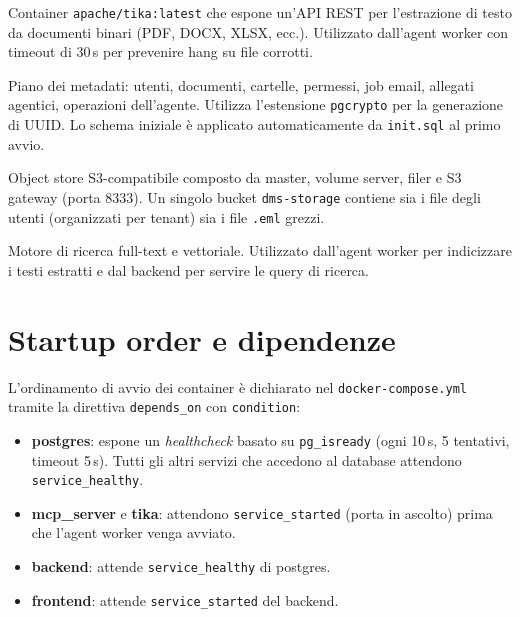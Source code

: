 \begin{description}[leftmargin=*]
    \item[Apache Tika (\texttt{tika})] Container \texttt{apache/tika:latest} che espone
          un'API REST per l'estrazione di testo da documenti binari (PDF, DOCX, XLSX, ecc.).
          Utilizzato dall'agent worker con timeout di 30\,s per prevenire hang su file corrotti.

    \item[PostgreSQL (\texttt{postgres:16})] Piano dei metadati: utenti, documenti, cartelle,
          permessi, job email, allegati agentici, operazioni dell'agente. Utilizza l'estensione
          \texttt{pgcrypto} per la generazione di UUID. Lo schema iniziale \`e applicato
          automaticamente da \texttt{init.sql} al primo avvio.

    \item[SeaweedFS] Object store S3-compatibile composto da master, volume server, filer
          e S3 gateway (porta 8333). Un singolo bucket \texttt{dms-storage} contiene sia
          i file degli utenti (organizzati per tenant) sia i file \texttt{.eml} grezzi.

    \item[OpenSearch (\texttt{opensearch:2.18.0})]  Motore di ricerca
          full-text e vettoriale. Utilizzato dall'agent worker per indicizzare i testi
          estratti e dal backend per servire le query di ricerca.
\end{description}

\section{Startup order e dipendenze}
\label{sec:startup_order}

L'ordinamento di avvio dei container \`e dichiarato nel \texttt{docker-compose.yml}
tramite la direttiva \texttt{depends\_on} con \texttt{condition}:

\begin{itemize}[leftmargin=*]
    \item \textbf{postgres}: espone un \emph{healthcheck} basato su \texttt{pg\_isready}
          (ogni 10\,s, 5 tentativi, timeout 5\,s). Tutti gli altri servizi che accedono
          al database attendono \texttt{service\_healthy}.
    \item \textbf{mcp\_server} e \textbf{tika}: attendono \texttt{service\_started}
          (porta in ascolto) prima che l'agent worker venga avviato.
    \item \textbf{backend}: attende \texttt{service\_healthy} di postgres.
    \item \textbf{frontend}: attende \texttt{service\_started} del backend.
\end{itemize}

